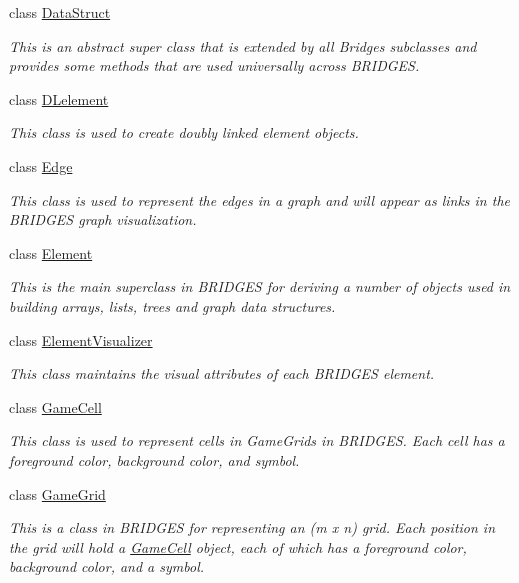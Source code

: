 \begin{DoxyCompactItemize}
class \hyperlink{classbridges_1_1base_1_1_data_struct}{Data\+Struct}
\begin{DoxyCompactList}\small\item\em This is an abstract super class that is extended by all Bridges subclasses and provides some methods that are used universally across B\+R\+I\+D\+G\+ES. \end{DoxyCompactList}\item 
class \hyperlink{classbridges_1_1base_1_1_d_lelement}{D\+Lelement}
\begin{DoxyCompactList}\small\item\em This class is used to create doubly linked element objects. \end{DoxyCompactList}\item 
class \hyperlink{classbridges_1_1base_1_1_edge}{Edge}
\begin{DoxyCompactList}\small\item\em This class is used to represent the edges in a graph and will appear as links in the B\+R\+I\+D\+G\+ES graph visualization. \end{DoxyCompactList}\item 
class \hyperlink{classbridges_1_1base_1_1_element}{Element}
\begin{DoxyCompactList}\small\item\em This is the main superclass in B\+R\+I\+D\+G\+ES for deriving a number of objects used in building arrays, lists, trees and graph data structures. \end{DoxyCompactList}\item 
class \hyperlink{classbridges_1_1base_1_1_element_visualizer}{Element\+Visualizer}
\begin{DoxyCompactList}\small\item\em This class maintains the visual attributes of each B\+R\+I\+D\+G\+ES element. \end{DoxyCompactList}\item 
class \hyperlink{classbridges_1_1base_1_1_game_cell}{Game\+Cell}
\begin{DoxyCompactList}\small\item\em This class is used to represent cells in Game\+Grids in B\+R\+I\+D\+G\+ES. Each cell has a foreground color, background color, and symbol. \end{DoxyCompactList}\item 
class \hyperlink{classbridges_1_1base_1_1_game_grid}{Game\+Grid}
\begin{DoxyCompactList}\small\item\em This is a class in B\+R\+I\+D\+G\+ES for representing an (m x n) grid. Each position in the grid will hold a \hyperlink{classbridges_1_1base_1_1_game_cell}{Game\+Cell} object, each of which has a foreground color, background color, and a symbol. \end{DoxyCompactList}\item 

\end{DoxyCompactItemize}

